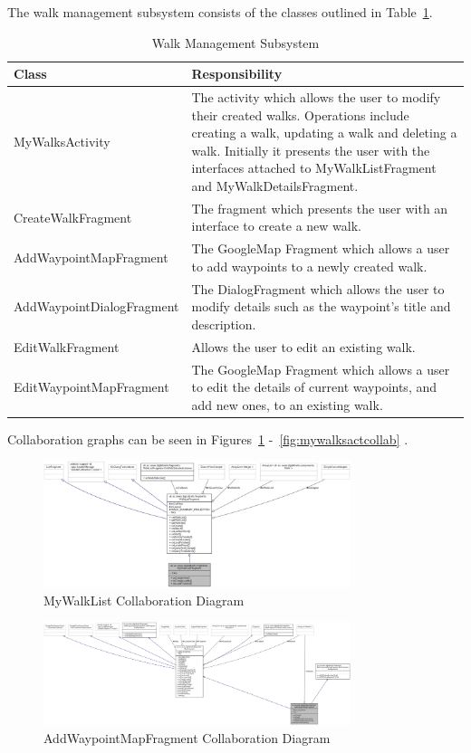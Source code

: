 \documentclass[11pt,a4paper]{report}
\begin{document}
The walk management subsystem consists of the classes outlined in Table~\ref{tab:walkcreate}.

\begin{longtable}{|p{5cm}|p{10cm}|}
\hline \caption{Walk Management Subsystem - Cont. on Next Page.} \endfoot
\hline \caption{Walk Management Subsystem} \label{tab:walkcreate} \endlastfoot
\hline
\textbf{Class} & \textbf{Responsibility} \\ \hline
MyWalksActivity & The activity which allows the user to modify their created walks. Operations include creating a walk, updating a walk and deleting a walk. Initially it presents the user with the interfaces attached to MyWalkListFragment and MyWalkDetailsFragment. \\ \hline
CreateWalkFragment & The fragment which presents the user with an interface to create a new walk. \\ \hline
AddWaypointMapFragment & The GoogleMap Fragment which allows a user to add waypoints to a newly created walk. \\ \hline
AddWaypointDialogFragment & The DialogFragment which allows the user to modify details such as the waypoint's title and description. \\ \hline
EditWalkFragment & Allows the user to edit an existing walk. \\ \hline
EditWaypointMapFragment & The GoogleMap Fragment which allows a user to edit the details of current waypoints, and add new ones, to an existing walk. \\ \hline
\end{longtable}

Collaboration graphs can be seen in Figures~\ref{fig:mywalklistcollab} -~\ref{fig:mywalksactcollab} .
\begin{figure}[H]
    \centering
    \includegraphics[width=0.8\textwidth]{mywalklistcollab}
    \caption{MyWalkList Collaboration Diagram}
    \label{fig:mywalklistcollab}
\end{figure}

\begin{figure}[H]
    \centering
    \includegraphics[width=0.8\textwidth]{addwaypointcollab}
    \caption{AddWaypointMapFragment Collaboration Diagram}
    \label{fig:addwaypointcollab}
\end{figure}
\end{document}
